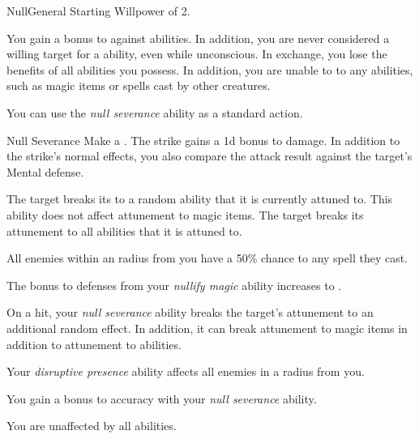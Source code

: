     \begin{feat}{Null}{General}
        \featpre Starting Willpower of 2.

         You gain a  bonus to  against  abilities.
        In addition, you are never considered a willing target for a  ability, even while unconscious.
        In exchange, you lose the benefits of all  abilities you possess.
        In addition, you are unable to  to any  abilities, such as magic items or spells cast by other creatures.

         You can use the \textit{null severance} ability as a standard action.
        \begin{apability}{Null Severance}
            Make a .
            The strike gains a \plus1d bonus to damage.
            In addition to the strike's normal effects, you also compare the attack result against the target's Mental defense.

            \hit The target breaks its  to a random ability that it is currently attuned to.
            This ability does not affect attunement to magic items.
            \crit The target breaks its attunement to all abilities that it is attuned to.
        \end{apability}

         All enemies within an \areamed radius from you have a 50\% chance to  any spell they cast.

         The bonus to defenses from your \textit{nullify magic} ability increases to .

         On a hit, your \textit{null severance} ability breaks the target's attunement to an additional random effect.
        In addition, it can break attunement to magic items in addition to attunement to abilities.

         Your \textit{disruptive presence} ability affects all enemies in a \arealarge radius  from you.

         You gain a  bonus to accuracy with your \textit{null severance} ability.

         You are unaffected by all  abilities.
    \end{feat}

